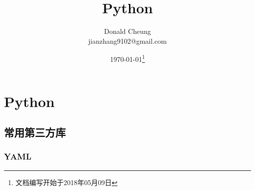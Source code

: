 \ifx\engineeringnotes\undefined
    \providecommand{\notesroot}{../..}
    \providecommand{\pythonroot}{.}

    \title{Python}
    \author{Donald Cheung\\jianzhang9102@gmail.com}
    \date{\today\footnote{文档编写开始于2018年05月09日}}

    
\else
    \providecommand{\pythonroot}{\engineeringroot/Python}
\fi

\chapter{Python}

\section{常用第三方库}
\subsection{YAML}

\ifx\engineeringnotes\undefined
    
\fi
